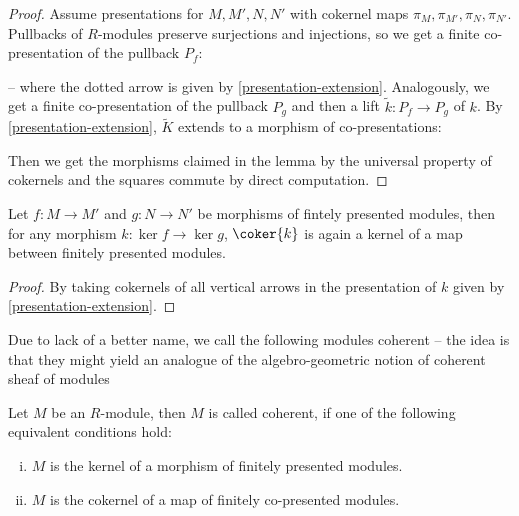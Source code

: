 \begin{proof}
  Assume presentations for $M,M',N,N'$ with cokernel maps $\pi_M,\pi_{M'},\pi_N,\pi_{N'}$.
  Pullbacks of $R$-modules preserve surjections and injections, so we get a finite co-presentation of the pullback $P_f$:
  \begin{center}
  \end{center}
  -- where the dotted arrow is given by \cref{presentation-extension}.
  Analogously, we get a finite co-presentation of the pullback $P_g$ and then a lift $\tilde{k}:P_f\to P_g$ of $k$.
  By \cref{presentation-extension}, $\tilde{K}$ extends to a morphism of co-presentations:
  \begin{center}
  \end{center}
  Then we get the morphisms claimed in the lemma by the universal property of cokernels and the squares commute by direct computation.
\end{proof}

\begin{lemma}
  \label{cokernel-closure}
  Let $f:M\to M'$ and $g:N\to N'$ be morphisms of fintely presented modules, then for any morphism
  $k:\ker{f}\to \ker{g}$, $\coker{k}$ is again a kernel of a map between finitely presented modules.
\end{lemma}

\begin{proof}
  By taking cokernels of all vertical arrows in the presentation of $k$ given by \cref{presentation-extension}.
\end{proof}

Due to lack of a better name, we call the following modules coherent --
the idea is that they might yield an analogue of the algebro-geometric notion of coherent sheaf of modules

\begin{definition}
  Let $M$ be an $R$-module, then $M$ is called coherent, if one of the following equivalent conditions hold:
  \begin{enumerate}[(i)]
  \item $M$ is the kernel of a morphism of finitely presented modules.
  \item $M$ is the cokernel of a map of finitely co-presented modules.
  \end{enumerate}
\end{definition}

